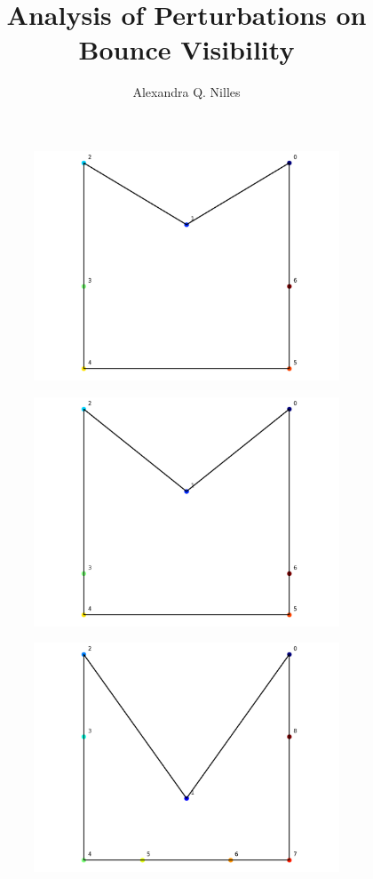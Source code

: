 \documentclass[]{article}  %
\title{Analysis of Perturbations on Bounce Visibility}
\author{Alexandra Q. Nilles%
}
\begin{document}
\begin{figure}
\centering
\begin{subfigure}{0.33\textwidth}
  \includegraphics[width=\textwidth]{figures/poly1.png}
\end{subfigure}%
\begin{subfigure}{0.33\textwidth}
  \includegraphics[width=\linewidth]{figures/poly3.png}
\end{subfigure}%
\begin{subfigure}{0.33\textwidth}
  \includegraphics[width=\linewidth]{figures/poly2.png}

\end{subfigure}
\end{figure}
\end{document}
